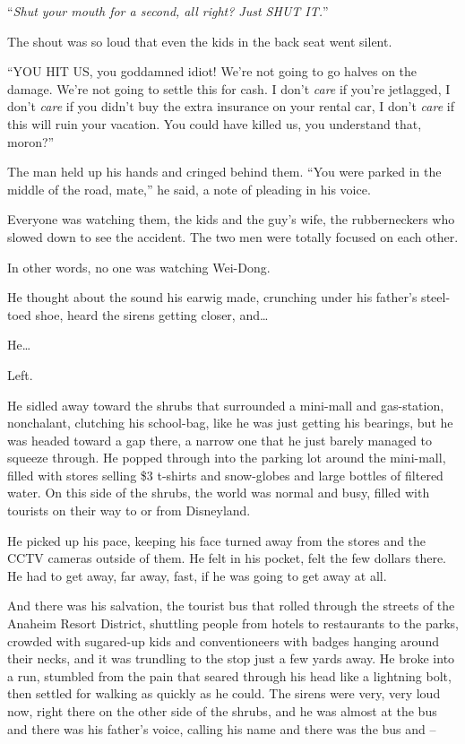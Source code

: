 ``\emph{Shut your mouth for a second, all right? Just SHUT IT.}''

The shout was so loud that even the kids in the back seat went
silent.

``YOU HIT US, you goddamned idiot! We're not going to go halves on
the damage. We're not going to settle this for cash. I don't
\emph{care} if you're jetlagged, I don't \emph{care} if you didn't
buy the extra insurance on your rental car, I don't \emph{care} if
this will ruin your vacation. You could have killed us, you
understand that, moron?''

The man held up his hands and cringed behind them. ``You were parked
in the middle of the road, mate,'' he said, a note of pleading in
his voice.

Everyone was watching them, the kids and the guy's wife, the
rubberneckers who slowed down to see the accident. The two men were
totally focused on each other.

In other words, no one was watching Wei-Dong.

He thought about the sound his earwig made, crunching under his
father's steel-toed shoe, heard the sirens getting closer, and\ldots{}

He\ldots{}

Left.

He sidled away toward the shrubs that surrounded a mini-mall and
gas-station, nonchalant, clutching his school-bag, like he was just
getting his bearings, but he was headed toward a gap there, a
narrow one that he just barely managed to squeeze through. He
popped through into the parking lot around the mini-mall, filled
with stores selling \$3 t-shirts and snow-globes and large bottles
of filtered water. On this side of the shrubs, the world was normal
and busy, filled with tourists on their way to or from Disneyland.

He picked up his pace, keeping his face turned away from the stores
and the CCTV cameras outside of them. He felt in his pocket, felt
the few dollars there. He had to get away, far away, fast, if he
was going to get away at all.

And there was his salvation, the tourist bus that rolled through
the streets of the Anaheim Resort District, shuttling people from
hotels to restaurants to the parks, crowded with sugared-up kids
and conventioneers with badges hanging around their necks, and it
was trundling to the stop just a few yards away. He broke into a
run, stumbled from the pain that seared through his head like a
lightning bolt, then settled for walking as quickly as he could.
The sirens were very, very loud now, right there on the other side
of the shrubs, and he was almost at the bus and there was his
father's voice, calling his name and there was the bus and --

